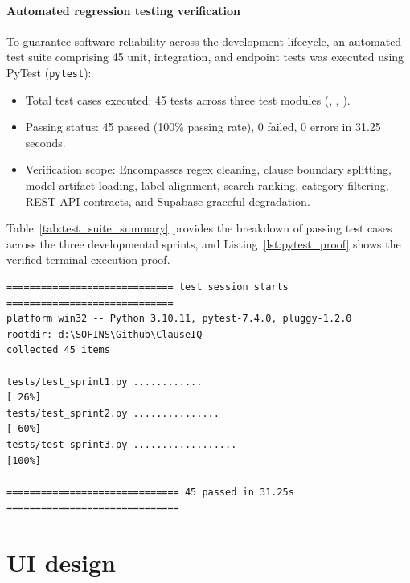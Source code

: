 \paragraph*{Automated regression testing verification}
To guarantee software reliability across the development lifecycle, an automated test suite comprising 45 unit, integration, and endpoint tests was executed using PyTest (\texttt{pytest}):
\begin{itemize}
    \item Total test cases executed: 45 tests across three test modules (, , ).
    \item Passing status: 45 passed (100\% passing rate), 0 failed, 0 errors in 31.25 seconds.
    \item Verification scope: Encompasses regex cleaning, clause boundary splitting, model artifact loading, label alignment, search ranking, category filtering, REST API contracts, and Supabase graceful degradation.
\end{itemize}

Table~\ref{tab:test_suite_summary} provides the breakdown of passing test cases across the three developmental sprints, and Listing~\ref{lst:pytest_proof} shows the verified terminal execution proof.



\begin{lstlisting}[basicstyle=\ttfamily\fontsize{8}{10}\selectfont, caption={Automated PyTest regression test execution console proof}, label={lst:pytest_proof}]
============================= test session starts =============================
platform win32 -- Python 3.10.11, pytest-7.4.0, pluggy-1.2.0
rootdir: d:\SOFINS\Github\ClauseIQ
collected 45 items

tests/test_sprint1.py ............                                      [ 26%]
tests/test_sprint2.py ...............                                   [ 60%]
tests/test_sprint3.py ..................                                [100%]

============================== 45 passed in 31.25s ==============================
\end{lstlisting}

\section{UI design}
\label{sec:ui_design}

